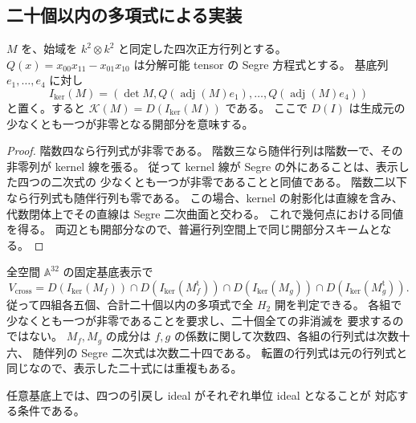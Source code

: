 \subsection{二十個以内の多項式による実装}

\begin{lemma}[Segreを避けるkernelの五生成開]
\label{lem:qa-segre-kernel-five-polynomials}
$M$ を、始域を $k^2\otimes k^2$ と同定した四次正方行列とする。
$Q(x)=x_{00}x_{11}-x_{01}x_{10}$ は分解可能 tensor の Segre 方程式とする。
基底列 $e_1,\ldots,e_4$ に対し
\[
 I_{\mathrm{ker}}(M)=
 \left(\det M,
       Q(\operatorname{adj}(M)e_1),\ldots,
       Q(\operatorname{adj}(M)e_4)\right)
 \tag{IK}\label{eq:qa-five-polynomial-kernel-ideal}
\]
と置く。すると $\mathcal K(M)=D(I_{\mathrm{ker}}(M))$ である。
ここで $D(I)$ は生成元の少なくとも一つが非零となる開部分を意味する。
\end{lemma}
\begin{proof}
階数四なら行列式が非零である。
階数三なら随伴行列は階数一で、その非零列が kernel 線を張る。
従って kernel 線が Segre の外にあることは、表示した四つの二次式の
少なくとも一つが非零であることと同値である。
階数二以下なら行列式も随伴行列も零である。
この場合、kernel の射影化は直線を含み、代数閉体上でその直線は
Segre 二次曲面と交わる。
これで幾何点における同値を得る。
両辺とも開部分なので、普遍行列空間上で同じ開部分スキームとなる。
\end{proof}

\begin{corollary}[四組の明示有限式]
\label{cor:qa-square-h2-twenty-polynomials}
全空間 $\mathbb A^{32}$ の固定基底表示で
\[
 V_{\mathrm{cross}}=
 D(I_{\mathrm{ker}}(M_f))\cap D(I_{\mathrm{ker}}(M_f^{\mathrm t}))
 \cap D(I_{\mathrm{ker}}(M_g))\cap D(I_{\mathrm{ker}}(M_g^{\mathrm t})).
\]
従って四組各五個、合計二十個以内の多項式で全 $H_2$ 開を判定できる。
各組で少なくとも一つが非零であることを要求し、二十個全ての非消滅を
要求するのではない。
$M_f,M_g$ の成分は $f,g$ の係数に関して次数四、各組の行列式は次数十六、
随伴列の Segre 二次式は次数二十四である。
転置の行列式は元の行列式と同じなので、表示した二十式には重複もある。

任意基底上では、四つの引戻し ideal がそれぞれ単位 ideal となることが
対応する条件である。
\end{corollary}

